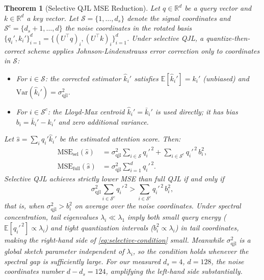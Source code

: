 \documentclass[11pt]{article}
\newtheorem{theorem}{Theorem}[section]
\newcommand{\R}{\mathbb{R}}
\newcommand{\E}{\mathbb{E}}
\newcommand{\Var}{\mathrm{Var}}
\begin{document}
\begin{theorem}[Selective QJL MSE Reduction]
\label{thm:selective-qjl}
Let $q \in \R^d$ be a query vector and $k \in \R^d$ a key vector.  Let
$\mathcal{S} = \{1, \ldots, d_s\}$ denote the signal coordinates and
$\mathcal{S}^c = \{d_s+1, \ldots, d\}$ the noise coordinates in the rotated
basis $\{q_i', k_i'\}_{i=1}^d = \{(U^\top q)_i, (U^\top k)_i\}_{i=1}^d$.
Under \emph{selective QJL}, a quantize-then-correct scheme applies
Johnson-Lindenstrauss error correction only to coordinates in $\mathcal{S}$:
\begin{itemize}[leftmargin=2em]
  \item For $i \in \mathcal{S}$: the corrected estimator $\hat{k}_i'$ satisfies
    $\E[\hat{k}_i'] = k_i'$ (unbiased) and
    $\Var(\hat{k}_i') = \sigma_{\mathrm{qjl}}^2$.
  \item For $i \in \mathcal{S}^c$: the Lloyd-Max centroid $\hat{k}_i' =
    \bar{k}_i'$ is used directly; it has bias $b_i = \bar{k}_i' - k_i'$ and
    zero additional variance.
\end{itemize}
Let $\hat{s} = \sum_i q_i' \hat{k}_i'$ be the estimated attention score.
Then:
\begin{align}
\mathrm{MSE}_{\mathrm{sel}}(\hat{s})
  &= \sigma_{\mathrm{qjl}}^2 \sum_{i \in \mathcal{S}} q_i'^{\,2}
    + \sum_{i \in \mathcal{S}^c} q_i'^{\,2}\, b_i^2, \\
\mathrm{MSE}_{\mathrm{full}}(\hat{s})
  &= \sigma_{\mathrm{qjl}}^2 \sum_{i=1}^d q_i'^{\,2}.
\end{align}
Selective QJL achieves strictly lower MSE than full QJL if and only if
\begin{equation}
\label{eq:selective-condition}
\sigma_{\mathrm{qjl}}^2 \sum_{i \in \mathcal{S}^c} q_i'^{\,2}
  > \sum_{i \in \mathcal{S}^c} q_i'^{\,2}\, b_i^2,
\end{equation}
that is, when $\sigma_{\mathrm{qjl}}^2 > b_i^2$ on average over the
noise coordinates.  Under spectral concentration, tail eigenvalues
$\lambda_i \ll \lambda_1$ imply both small query energy
($\E[q_i'^{\,2}] \propto \lambda_i$) and tight quantization intervals
($b_i^2 \propto \lambda_i$) in tail coordinates, making the right-hand
side of \eqref{eq:selective-condition} small.  Meanwhile
$\sigma_{\mathrm{qjl}}^2$ is a global sketch parameter independent of
$\lambda_i$, so the condition holds whenever the spectral gap is
sufficiently large.  For our measured $d_s = 4$, $d = 128$, the noise
coordinates number $d - d_s = 124$, amplifying the left-hand side
substantially.
\end{theorem}
\end{document}
